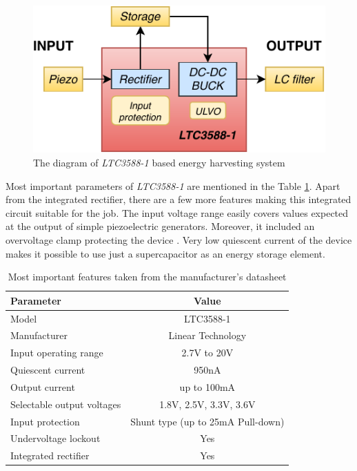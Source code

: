 \documentclass[12pt,a4paper]{article}
\begin{document}
\begin{figure}[ht!]
\includegraphics[scale=1.2]{LTC3588.pdf}
\caption{The diagram of \textit{LTC3588-1} based energy harvesting system}
\label{fig:ltc3588diagram}
\end{figure}

\par

Most important parameters of \textit{LTC3588-1} are mentioned in the Table \ref{tab:ltc3588_params}. Apart from the integrated rectifier, there are a few more features making this integrated circuit suitable for the job.  The input voltage range easily covers values expected at the output of simple piezoelectric generators. Moreover, it included an overvoltage clamp protecting the device \cite{ltc3588_params}. Very low quiescent current of the device makes it possible to use just a supercapacitor as an energy storage element.

\begin{table}[ht!]
\begin{tabular}{|l|c|}
\hline
\textbf{Parameter}	& \textbf{Value} 	\\ \hline
Model  				& LTC3588-1       \\ \hline
Manufacturer    	& Linear Technology	\\ \hline
Input operating range      &  2.7V to 20V 		\\ \hline
Quiescent current     &  950nA			\\ \hline
Output current        &  up to 100mA			\\ \hline
Selectable output voltages & 1.8V, 2.5V, 3.3V, 3.6V\\ \hline
Input protection &  Shunt type (up to 25mA Pull-down)\\ \hline
Undervoltage lockout 	&  Yes 		\\ \hline
Integrated rectifier 	&  Yes 		\\ \hline
\end{tabular}
\caption{Most important features taken from the manufacturer's datasheet \cite{ltc3588_params}}
\label{tab:ltc3588_params}
\end{table}
\par
\end{document}
